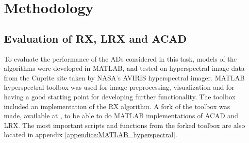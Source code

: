 \newpage 
\chapter{Methodology}
\label{sec:methodology}

\section{Evaluation of RX, LRX and ACAD }
\label{sec:MATLAB_methodology}
To evaluate the performance of the ADs considered in this task, models of the algorithms were developed in MATLAB, and tested on hyperspectral image data from the Cuprite site \cite{Cuprite_data} taken by NASA's AVIRIS hyperspectral imager. MATLAB hyperspectral toolbox \cite{MATLAB_hyperspectral_toolbox} was used for image preprocessing, visualization and for having a good starting point for developing further functionality. The toolbox included an implementation of the RX algorithm. A fork of the toolbox was made, available at \cite{MATLAB_hyperspectral_toolbox_fork}, to be able to do MATLAB implementations of ACAD and LRX. The most important scripts and functions from the forked toolbox are also located in appendix \ref{appendice:MATLAB_hyperspectral}.


